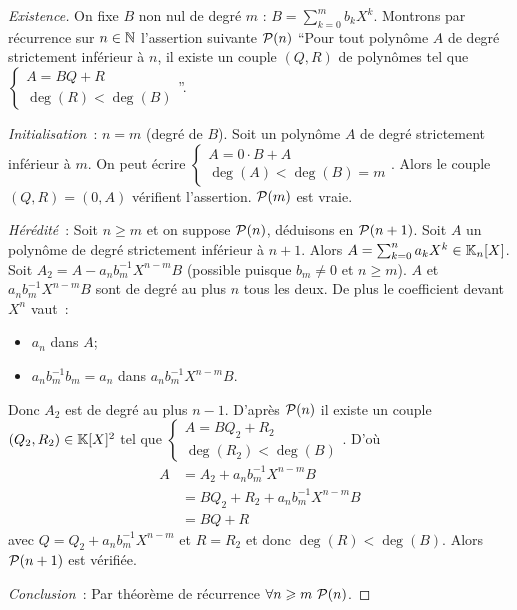 \begin{proof}[Existence]
  On fixe \(B\) non nul de degré \(m\) : \(B = \sum_{k = 0}^m b_k X^k\). Montrons
  par récurrence sur \(n \in \N\) l'assertion suivante \(\P(n)\) ``Pour tout
  polynôme \(A\) de degré strictement inférieur à \(n\), il existe un couple
  \((Q,R)\) de polynômes tel que \(\begin{cases} A = BQ+R \\ \deg(R) <
  \deg(B)\end{cases}\)''.

  \emph{Initialisation}~: \(n = m\) (degré de \(B\)). Soit un polynôme \(A\) de
  degré strictement inférieur à \(m\). On peut écrire \(\begin{cases} A = 0 \cdot
  B+A \\ \deg(A) < \deg(B) = m\end{cases}\). Alors le couple \((Q,R) = (0,A)\)
  vérifient l'assertion. \(\P(m)\) est vraie.

  \emph{Hérédité}~: Soit \(n \geqslant m\) et on suppose \(\P(n)\), déduisons en
  \(\P(n+1)\). Soit \(A\) un polynôme de degré strictement inférieur à \(n+1\).
  Alors \(A = \sum_{k = 0}^n a_k X^k \in \K_n[X]\). Soit \(A_2 =
  A - a_n b_m^{-1} X^{n-m} B\) (possible puisque \({b_m} \neq 0\) et \(n \geqslant
  m\)).
  \(A\) et \(a_nb_m^{-1}X^{n-m}B\) sont de degré au plus \(n\) tous les deux. De
  plus le coefficient devant \(X^n\) vaut~:
  \begin{itemize}
    \item \(a_n\) dans \(A\);
    \item \(a_n b_m^{-1} b_m = a_n\) dans \(a_n b_m^{-1} X^{n-m}B\).
  \end{itemize}
  Donc \(A_2\) est de degré au plus \(n-1\). D'après \(\P(n)\) il existe un
  couple \((Q_2,R_2) \in \K[X]^2\) tel que \(\begin{cases} A = BQ_2+R_2 \\
  \deg(R_2) < \deg(B)\end{cases}\). D'où
  \begin{align}
    A& = A_2 + a_n b_m^{-1}X^{n-m}B\\
    & = BQ_2+R_2 +a_n b_m^{-1}X^{n-m}B\\
    & = BQ+R
  \end{align}
  avec \(Q = Q_2+a_n b_m^{-1}X^{n-m}\) et \(R = R_2\) et donc \(\deg(R) < \deg(B)\).
  Alors \(\P(n+1)\) est vérifiée.

  \emph{Conclusion}~: Par théorème de récurrence \(\forall n \geqslant m \
  \P(n)\).
\end{proof}

